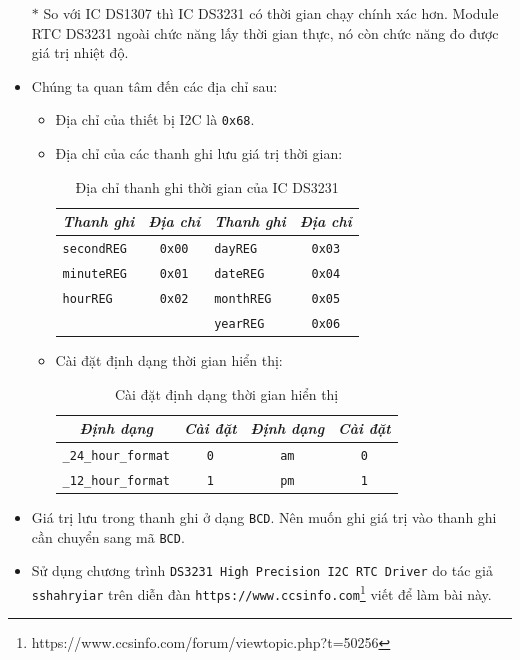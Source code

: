 \begin{itemize}
\item[$\ast$] So với IC DS1307 thì IC DS3231 có thời gian chạy chính xác hơn. Module RTC DS3231 ngoài chức năng lấy thời gian thực, nó còn chức năng đo được giá trị nhiệt độ.
\item Chúng ta quan tâm đến các địa chỉ sau:
\begin{itemize}
\item Địa chỉ của thiết bị I2C là \verb|0x68|.
\item Địa chỉ của các thanh ghi lưu giá trị thời gian:
\begin{table}[!h]
\begin{center}
\begin{tabular}{|l|c|l|c|}\hline
\textit{Thanh ghi} & \textit{Địa chỉ} & \textit{Thanh ghi} & \textit{Địa chỉ}\\ \hline
\verb|secondREG| & \verb|0x00| & \verb|dayREG| & \verb|0x03| \\ \hline
\verb|minuteREG| & \verb|0x01| & \verb|dateREG| & \verb|0x04| \\ \hline
\verb|hourREG| & \verb|0x02| & \verb|monthREG| & \verb|0x05| \\ \hline
& & \verb|yearREG| & \verb|0x06| \\ \hline
\end{tabular}
\end{center}
\caption{Địa chỉ thanh ghi thời gian của IC DS3231}
\end{table}
\item Cài đặt định dạng thời gian hiển thị:
\begin{table}[!h]
\begin{center}
\begin{tabular}{|c|c|c|c|}\hline
\textit{Định dạng} & \textit{Cài đặt} & \textit{Định dạng} & \textit{Cài đặt} \\ \hline
\verb|_24_hour_format| & \verb|0| & \verb|am| & \verb|0| \\ \hline
\verb|_12_hour_format| & \verb|1| & \verb|pm| & \verb|1| \\ \hline
\end{tabular}
\end{center}
\caption{Cài đặt định dạng thời gian hiển thị}
\end{table}
\end{itemize}
\item Giá trị lưu trong thanh ghi ở dạng \verb|BCD|. Nên muốn ghi giá trị vào thanh ghi cần chuyển sang mã \verb|BCD|.
\item Sử dụng chương trình \verb|DS3231 High Precision I2C RTC Driver| do tác giả \verb|sshahryiar| trên diễn đàn \verb|https://www.ccsinfo.com|\footnote{https://www.ccsinfo.com/forum/viewtopic.php?t=50256} viết để làm bài này.

\end{itemize}
